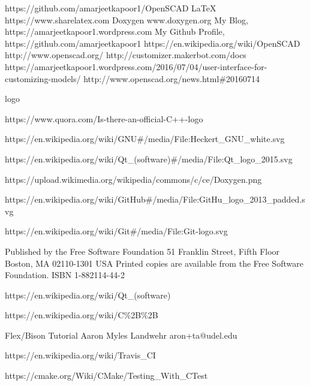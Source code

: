\begin{thebibliography}{22}
\bibitem{}  https://github.com/amarjeetkapoor1/OpenSCAD
\bibitem{} \LaTeX{} https://www.sharelatex.com
\bibitem{} Doxygen www.doxygen.org
\bibitem{} My Blog, https://amarjeetkapoor1.wordpress.com
\bibitem{} My Github Profile, https://github.com/amarjeetkapoor1
\bibitem{} https://en.wikipedia.org/wiki/OpenSCAD
\bibitem{} http://www.openscad.org/
\bibitem{} http://customizer.makerbot.com/docs
\bibitem{} https://amarjeetkapoor1.wordpress.com/2016/07/04/user-interface-for-customizing-models/
\bibitem{} http://www.openscad.org/news.html\#20160714


logo

\bibitem{} https://www.quora.com/Is-there-an-official-C++-logo

\bibitem{} https://en.wikipedia.org/wiki/GNU\#/media/File:Heckert\_GNU\_white.svg

\bibitem{} https://en.wikipedia.org/wiki/Qt\_(software)\#/media/File:Qt\_logo\_2015.svg


\bibitem{} https://upload.wikimedia.org/wikipedia/commons/c/ce/Doxygen.png

\bibitem{} https://en.wikipedia.org/wiki/GitHub\#/media/File:GitHu\_logo\_2013\_padded.svg

\bibitem{} https://en.wikipedia.org/wiki/Git\#/media/File:Git-logo.svg

\bibitem{}
Published by the Free Software Foundation
51 Franklin Street, Fifth Floor
Boston, MA 02110-1301 USA
Printed copies are available from the Free Software Foundation.
ISBN 1-882114-44-2

\bibitem{} https://en.wikipedia.org/wiki/Qt\_(software)

\bibitem{} https://en.wikipedia.org/wiki/C\%2B\%2B

\bibitem{} Flex/Bison Tutorial
Aaron Myles Landwehr
aron+ta@udel.edu

\bibitem{} https://en.wikipedia.org/wiki/Travis\_CI

\bibitem{} https://cmake.org/Wiki/CMake/Testing\_With\_CTest

\end{thebibliography}
